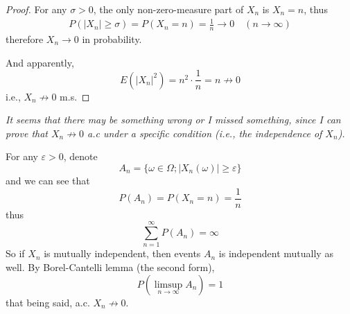 \documentclass{homework}
\begin{document}
\begin{subproblem}
        \item
        \begin{proof}
            For any $\sigma>0$, the only non-zero-measure part
            of $X_n$ is $X_n=n$, thus
            \[\begin{aligned}
                P(|X_n|\geq\sigma)=P(X_n=n)=\frac{1}{n}\to 0
                \quad(n\to\infty)
            \end{aligned}\]
            therefore $X_n\to 0$ in probability.

            And apparently,
            \[E(|X_n|^2)=n^2\cdot\frac{1}{n}=n\not\to 0\]
            i.e., $X_n\not\to 0$ m.s.
        \end{proof}

        \item
        {
            \it
            It seems that there may be something wrong or I missed something,
            since I can
            prove that $X_n\not\to 0$ a.c under a specific condition
            (i.e., the independence of $X_n$).

            For any $\varepsilon>0$, denote
            \[A_n=\{\omega\in\Omega;|X_n(\omega)|\geq\varepsilon\}\]
            and we can see that
            \[P(A_n)=P(X_n=n)=\frac{1}{n}\]
            thus
            \[\sum_{n=1}^\infty P(A_n)=\infty\]
            So if $X_n$ is mutually independent, then events $A_n$
            is independent mutually as well. By Borel-Cantelli lemma
            (the second form), 
            \[P\left(\limsup_{n\to\infty}A_n\right)=1\]
            that being said, a.c. $X_n\not\to 0$.
        }



\end{subproblem}
\end{document}
